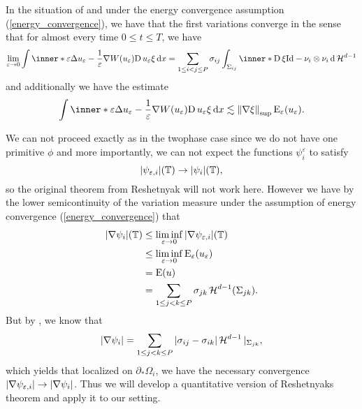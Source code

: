 \begin{proposition}
	\label{convergence_of_curvature_multiphase}
	In the situation of  and under the energy convergence assumption (\ref{energy_convergence}), we have that the first variations converge in the sense that for almost every time $ 0 \leq t \leq T $, we have
	\begin{equation*}
		\lim_{ \varepsilon \to 0 }
			\int
				\inner*{ 
					\varepsilon \Delta u_{ \varepsilon } - \frac{ 1 }{ 
					\varepsilon } \nabla W ( u_{ \varepsilon } ) 
				}
				{ \diff u_{ \varepsilon } \xi } 
			\dd{ x }
		=
		\sum_{ 1 \leq i < j \leq P }
			\sigma_{ i j }
			\int_{ \Sigma_{ i j } }
				\inner*{ \diff \xi }{ \mathrm{Id} - \nu_{ i } \otimes \nu_{ i } }
			\dd{ \hm^{ d - 1} }
	\end{equation*}
	and additionally we have the estimate
	\begin{equation}
		\label{pointwise_estimate_for_curvature}
		\int
		\inner*{ 
			\varepsilon \Delta u_{ \varepsilon } - \frac{ 1 }{ \varepsilon } 	
			\nabla W ( u_{ \varepsilon } ) }
		{ \diff u_{ \varepsilon } \xi }
		\dd{ x }
		\lesssim
		\norm{ \nabla \xi }_{ \sup }
		\energy_{ \varepsilon } ( u_{ \varepsilon } ).
	\end{equation}
\end{proposition}

\begin{remark}
	We can not proceed exactly as in the twophase case since we do not have one primitive $ \phi $ and more importantly, we can not expect the functions $ \psi_{ i }^{ \varepsilon } $ to satisfy 
	\begin{equation}
		\label{energy_convergence_of_psi_i}
		\abs{ \psi_{ \varepsilon ,i } } ( \operatorname{\mathbb{T}} ) \to \abs{ \psi_{ i } } ( 
		\operatorname{\mathbb{T}} ),
	\end{equation}
	so the original theorem from Reshetnyak will not work here. However we have by the lower semicontinuity of the variation measure under the assumption of energy convergence (\ref{energy_convergence}) that
	\begin{align*}
		\abs{ \nabla \psi_{ i } } ( \operatorname{\mathbb{T}} )
		&
		\leq
		\liminf_{ \varepsilon \to 0 }
			\abs{ \nabla \psi_{ \varepsilon , i } } ( \operatorname{\mathbb{T}} )
		\\
		& \leq
		\liminf_{ \varepsilon \to 0 }
			\operatorname{E}_{ \varepsilon } ( u_{ \varepsilon } )
		\\
		& =
		\operatorname{E} ( u )
		\\
		& =
		\sum_{ 1 \leq j < k \leq P }
			\sigma_{ j k }
			\operatorname{\mathcal{H}}^{ d -1 } ( \Sigma_{ j k } ).
	\end{align*}
	But by , we know that
	\begin{equation*}
		\abs{ \nabla \psi_{ i } }
		=
		\sum_{ 1 \leq j < k \leq P }
			\abs{ \sigma_{ i j } - \sigma_{ i k } }
			\operatorname{\mathcal{H}}^{ d - 1 } |_{ \Sigma_{ j k } },
	\end{equation*}
	which yields that localized on $ \partial_{ \ast } \Omega_{ i } $, we have 
	the necessary convergence $ \abs{ \nabla \psi_{ \varepsilon ,i } } \to 
	\abs{ \nabla \psi_{ i } } $. Thus we will develop a quantitative version of 
	Reshetnyaks theorem and apply it to our setting.
\end{remark}

